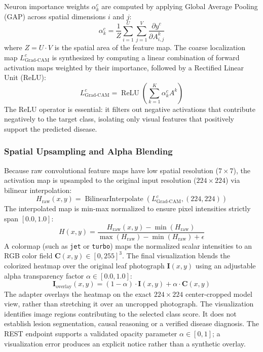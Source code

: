 Neuron importance weights $\alpha_k^c$ are computed by applying Global Average Pooling (GAP) across spatial dimensions $i$ and $j$:
\begin{equation}
    \alpha_k^c = \frac{1}{Z} \sum_{i=1}^{U} \sum_{j=1}^{V} \frac{\partial y^c}{\partial A_{i, j}^k}
\end{equation}
where $Z = U \cdot V$ is the spatial area of the feature map. The coarse localization map $L_{\text{Grad-CAM}}^c$ is synthesized by computing a linear combination of forward activation maps weighted by their importance, followed by a Rectified Linear Unit (ReLU):
\begin{equation}
    L_{\text{Grad-CAM}}^c = \operatorname{ReLU}\left( \sum_{k=1}^{K} \alpha_k^c A^k \right)
\end{equation}
The ReLU operator is essential: it filters out negative activations that contribute negatively to the target class, isolating only visual features that positively support the predicted disease.

\subsubsection{Spatial Upsampling and Alpha Blending}
Because raw convolutional feature maps have low spatial resolution ($7 \times 7$), the activation map is upsampled to the original input resolution ($224 \times 224$) via bilinear interpolation:
\begin{equation}
    H_{\text{raw}}(x, y) = \operatorname{BilinearInterpolate}(L_{\text{Grad-CAM}}^c, (224, 224))
\end{equation}
The interpolated map is min-max normalized to ensure pixel intensities strictly span $[0.0, 1.0]$:
\begin{equation}
    H(x, y) = \frac{H_{\text{raw}}(x, y) - \min(H_{\text{raw}})}{\max(H_{\text{raw}}) - \min(H_{\text{raw}}) + \epsilon}
\end{equation}
A colormap (such as \texttt{jet} or \texttt{turbo}) maps the normalized scalar intensities to an RGB color field $\mathbf{C}(x, y) \in [0, 255]^3$. The final visualization blends the colorized heatmap over the original leaf photograph $\mathbf{I}(x, y)$ using an adjustable alpha transparency factor $\alpha \in [0.0, 1.0]$:
\begin{equation}
    \mathbf{I}_{\text{overlay}}(x, y) = (1 - \alpha) \cdot \mathbf{I}(x, y) + \alpha \cdot \mathbf{C}(x, y)
\end{equation}
The adapter overlays the heatmap on the exact $224\times224$ center-cropped model view, rather than stretching it over an uncropped photograph. The visualization identifies image regions contributing to the selected class score. It does not establish lesion segmentation, causal reasoning or a verified disease diagnosis. The REST endpoint supports a validated opacity parameter $\alpha\in[0,1]$; a visualization error produces an explicit notice rather than a synthetic overlay.

